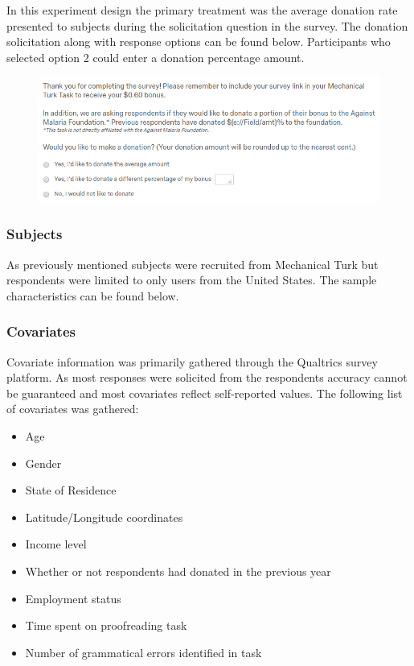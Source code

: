 \documentclass[]{article}
\providecommand{\tightlist}{%
  \setlength{\itemsep}{0pt}\setlength{\parskip}{0pt}}
\begin{document}
In this experiment design the primary treatment was the average donation
rate presented to subjects during the solicitation question in the
survey. The donation solicitation along with response options can be
found below. Participants who selected option 2 could enter a donation
percentage amount.

\begin{figure}[htbp]
\centering
\includegraphics{treatment.PNG}
\caption{}
\end{figure}

\subsubsection{Subjects}\label{subjects}

As previously mentioned subjects were recruited from Mechanical Turk but
respondents were limited to only users from the United States. The
sample characteristics can be found below.

\subsubsection{Covariates}\label{covariates}

Covariate information was primarily gathered through the Qualtrics
survey platform. As most responses were solicited from the respondents
accuracy cannot be guaranteed and most covariates reflect self-reported
values. The following list of covariates was gathered:

\begin{itemize}
\tightlist
\item
  Age
\item
  Gender
\item
  State of Residence
\item
  Latitude/Longitude coordinates
\item
  Income level
\item
  Whether or not respondents had donated in the previous year
\item
  Employment status
\item
  Time spent on proofreading task
\item
  Number of grammatical errors identified in task
\end{itemize}
\end{document}
